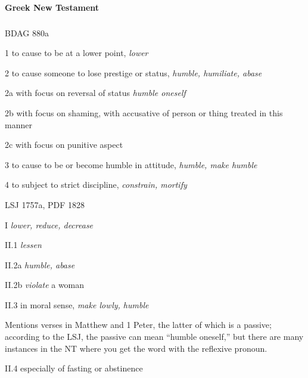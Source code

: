		\paragraph{Greek New Testament} %
			\label{HUMILITY-GREEK}
		
			\subparagraph{\texorpdfstring{}{}}
				\label{TAPEINOO}
			
				\begin{compactdesc}
					\item[BDAG 880a] \textbf{}
						\begin{compactitem}
							\item[1] to cause to be at a lower point, \textit{lower}
							\item[2] to cause someone to lose prestige or status, \textit{humble, humiliate, abase}
							\item[2a] with focus on reversal of status  \textit{humble oneself}
							\item[2b] with focus on shaming, with accusative of person or thing treated in this manner
							\item[2c] with focus on punitive aspect
							\item[3] to cause to be or become humble in attitude, \textit{humble, make humble}
							\item[4] to subject to strict discipline, \textit{constrain, mortify}
						\end{compactitem}
					\item[LSJ 1757a, PDF 1828] \textbf{}
						\begin{compactitem}
							\item[I] \textit{lower, reduce, decrease}
							\item[II.1] \textit{lessen}
							\item[II.2a] \textit{humble, abase}
							\item[II.2b] \textit{violate} a woman
							\item[II.3] in moral sense, \textit{make lowly, humble}
								\begin{compactitem}
									\item Mentions verses in Matthew and 1 Peter, the latter of which is a passive; according to the LSJ, the passive can mean ``humble oneself,'' but there are many instances in the NT where you get the word with the reflexive pronoun.
								\end{compactitem}
							\item[II.4] especially of fasting or abstinence
						\end{compactitem}
				\end{compactdesc}
				
